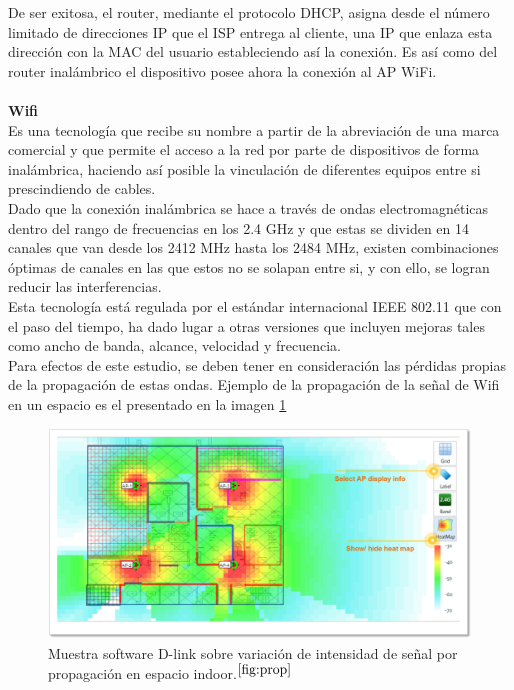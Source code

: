 De ser exitosa, el router, mediante el protocolo \ac{DHCP}, asigna desde el número limitado de direcciones IP que el \ac{ISP} entrega al cliente, una IP que enlaza esta dirección con la MAC del usuario estableciendo así la conexión. Es así como del router inalámbrico el dispositivo posee ahora la conexión al AP WiFi.\\\\

\textbf{Wifi}\\

Es una tecnología que recibe su nombre a partir de la abreviación de una marca comercial y que permite el acceso a la red por parte de dispositivos de forma inalámbrica, haciendo así posible  la vinculación de diferentes equipos entre si prescindiendo de cables.\\

Dado que la conexión inalámbrica se hace a través de ondas electromagnéticas dentro del rango de frecuencias en los 2.4 GHz y que estas se dividen en 14 canales que van desde los 2412 MHz hasta los 2484 MHz, existen combinaciones óptimas de canales en las que estos no se solapan entre si, y con ello, se logran reducir las interferencias.\\

Esta tecnología está regulada por el estándar internacional IEEE 802.11 que con el paso del tiempo, ha dado lugar a otras versiones que incluyen mejoras tales como ancho de banda, alcance, velocidad y frecuencia.\\

Para efectos de este estudio, se deben tener en consideración las pérdidas propias de la propagación de estas ondas. Ejemplo de la propagación de la señal de Wifi en un espacio es el presentado en la imagen \ref{fig:propagacion} \\

\begin{figure}[h!]
\centering
\includegraphics[scale=0.8]{./imagenes/propagacion}
\caption{Muestra software D-link sobre variación de intensidad de señal por propagación en espacio indoor.$^{\ref{fig:prop}}$}
\label{fig:propagacion}
\end{figure}

